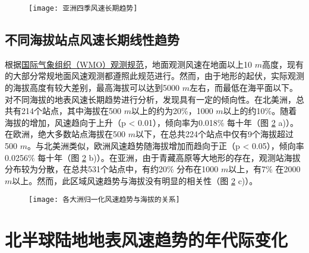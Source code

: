 \begin{figure}[!htbp]
    \centering
    \texttt{[image: 亚洲四季风速长期趋势]}
    \label{fig:ASwindtrend}
\end{figure}

\subsection{不同海拔站点风速长期线性趋势}

根据\href{https://community.wmo.int/activity-areas/imop/cimo-guide/cimo-guide-preliminary-2018-edition}{国际气象组织（WMO）观测规范}，地面观测风速在地面以上10 $m$高度，现有的大部分常规地面风速观测都遵照此规范进行。然而，由于地形的起伏，实际观测的海拔高度有较大差别，最高海拔可以达到5000 $m$左右，而最低在海平面以下。对不同海拔的地表风速长期趋势进行分析，发现具有一定的倾向性。在北美洲，总共有214个站点，其中海拔在500 $m$以上的约为20\%，1000 $m$以上的约10\%。随着海拔的增加，风速趋向于上升（p < 0.01），倾向率为0.018\% 每十年（图 \ref{fig:regionalwindvselevation} a)）。在欧洲，绝大多数站点海拔在500 $m$以下，在总共224个站点中仅有9个海拔超过500 $m$。与北美洲类似，欧洲风速趋势随海拔增加而趋向于正（p < 0.05），倾向率0.0256\% 每十年（图 \ref{fig:regionalwindvselevation} b)）。在亚洲，由于青藏高原等大地形的存在，观测站海拔分布较为分散，在总共531个站点中，有约20\% 分布在1000 $m$以上，有7\% 在2000 $m$以上。然而，此区域风速趋势与海拔没有明显的相关性（图 \ref{fig:regionalwindvselevation} c)）。

\begin{figure}[!htbp]
    \centering
    \texttt{[image: 各大洲归一化风速趋势与海拔的关系]}
    \label{fig:regionalwindvselevation}
\end{figure}

\section{北半球陆地地表风速趋势的年代际变化}

